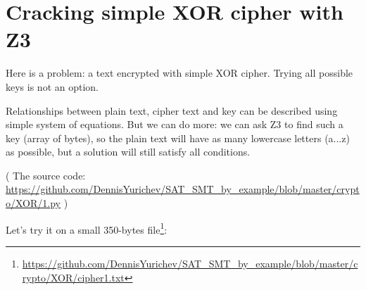 \section{Cracking simple XOR cipher with Z3}
\label{XOR_Z3}

\renewcommand{\CURPATH}{crypto/XOR}

Here is a problem: a text encrypted with simple XOR cipher.
Trying all possible keys is not an option.

Relationships between plain text, cipher text and key can be described using simple system of equations.
But we can do more: we can ask Z3 to find such a key (array of bytes), so the plain text will have as many lowercase
letters (a...z) as possible, but a solution will still satisfy all conditions.



( The source code: \url{https://github.com/DennisYurichev/SAT_SMT_by_example/blob/master/crypto/XOR/1.py} )

Let's try it on a small 350-bytes file\footnote{\url{https://github.com/DennisYurichev/SAT_SMT_by_example/blob/master/crypto/XOR/cipher1.txt}}:

